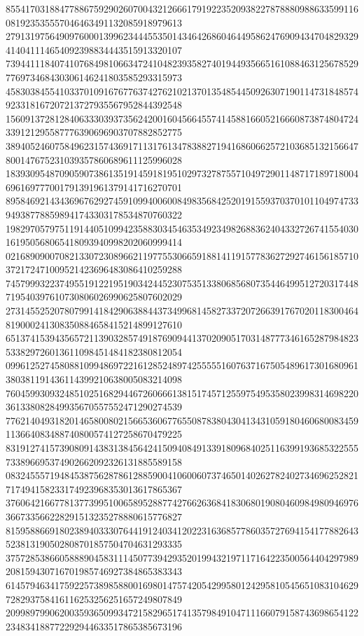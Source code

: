 \begin{DoxyCode}
      855417031884778867592902607004321266617919223520938227878880988633599116081923535557046463491132085918979613
      279131975649097600013996234445535014346426860464495862476909434704829329414041114654092398834443515913320107
      739441118407410768498106634724104823935827401944935665161088463125678529776973468430306146241803585293315973
      458303845541033701091676776374276210213701354854450926307190114731848574923318167207213727935567952844392548
      156091372812840633303937356242001604566455741458816605216660873874804724339121295587776390696903707882852775
      389405246075849623157436917113176134783882719416860662572103685132156647800147675231039357860689611125996028
      183930954870905907386135191459181951029732787557104972901148717189718004696169777001791391961379141716270701
      895846921434369676292745910994006008498356842520191559370370101104974733949387788598941743303178534870760322
      198297057975119144051099423588303454635349234982688362404332726741554030161950568065418093940998202060999414
      021689090070821330723089662119775530665918814119157783627292746156185710372172471009521423696483086410259288
      745799932237495519122195190342445230753513380685680735446499512720317448719540397610730806026990625807602029
      273145525207807991418429063884437349968145827337207266391767020118300464819000241308350884658415214899127610
      651374153943565721139032857491876909441370209051703148777346165287984823533829726013611098451484182380812054
      099612527458088109948697221612852489742555551607637167505489617301680961380381191436114399210638005083214098
      760459930932485102516829446726066613815174571255975495358023998314698220361338082849935670557552471290274539
      776214049318201465800802156653606776550878380430413431059180460680083459113664083488740800574127258670479225
      831912741573908091438313845642415094084913391809684025116399193685322555733896695374902662092326131885589158
      083245557194845387562878612885900410600607374650140262782402734696252821717494158233174923968353013617865367
      376064216677813773995100658952887742766263684183068019080460984980946976366733566228291513235278880615776827
      815958866918023894033307644191240341202231636857786035727694154177882643523813190502808701857504704631293335
      375728538660588890458311145077394293520199432197117164223500564404297989208159430716701985746927384865383343
      614579463417592257389858800169801475742054299580124295810545651083104629728293758416116253256251657249807849
      209989799062003593650993472158296517413579849104711166079158743698654122234834188772292944633517865385673196

\end{DoxyCode}
